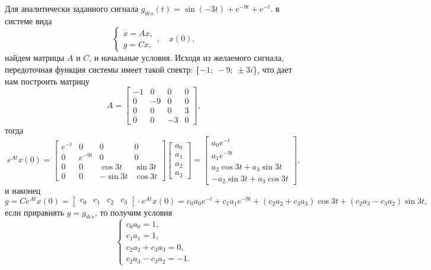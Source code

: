 Для аналитически заданного сигнала $g_{des}(t)=\sin (-3t) + e^{-9t} + e^{-t}$.
в системе вида
\begin{equation*}
    \begin{cases}
        \dot x=Ax,\\
        g=Cx,
    \end{cases},\quad x(0),
\end{equation*}
найдем матрицы $A$ и $C$, и начальные условия. Исходя из желаемого сигнала,
передоточная функция системы имеет такой спектр: \{$-1;\: -9;\: \pm3i$\},
что дает нам построить матрицу
\begin{equation*}
    A=\begin{bmatrix}
        -1&0&0&0\\0&-9&0&0\\0&0&0&3\\0&0&-3&0
    \end{bmatrix},
\end{equation*}
тогда
\begin{equation*}
    e^{At}x(0)=\begin{bmatrix}
        e^{-t}&0&0&0\\0&e^{-9t}&0&0\\0&0&\cos 3t&\sin 3t\\0&0&-\sin 3t&\cos 3t
    \end{bmatrix}
    \begin{bmatrix}
        a_0\\a_1\\a_2\\a_3
    \end{bmatrix}=
    \begin{bmatrix}
        a_0e^{-t}\\a_1e^{-9t}\\a_2\cos 3t+a_3\sin 3t\\-a_2\sin 3t+a_3\cos 3t
    \end{bmatrix},
\end{equation*}
и наконец
\begin{equation*}
    g=Ce^{At}x(0)=\begin{bmatrix}
        c_0&c_1&c_2&c_3
    \end{bmatrix}\cdot e^{At}x(0)=
    c_0a_0e^{-t}+c_1a_1e^{-9t}+(c_2a_2+c_3a_3)\cos 3t+(c_2a_3-c_3a_2)\sin 3t,
\end{equation*}
если приравнять $g=g_{des}$, то получим условия
\begin{equation*}
    \begin{cases}
        c_0a_0=1,\\
        c_1a_1=1,\\
        c_2a_2+c_3a_3=0,\\
        c_2a_3-c_3a_2=-1.
    \end{cases}
\end{equation*}
